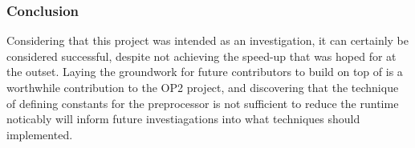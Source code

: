 \subsubsection{Conclusion}
Considering that this project was intended as an investigation, it can certainly be considered successful, despite not achieving the speed-up that was hoped for at the outset. Laying the groundwork for future contributors to build on top of is a worthwhile contribution to the OP2 project, and discovering that the technique of defining constants for the preprocessor is not sufficient to reduce the runtime noticably will inform future investiagations into what techniques should implemented.
